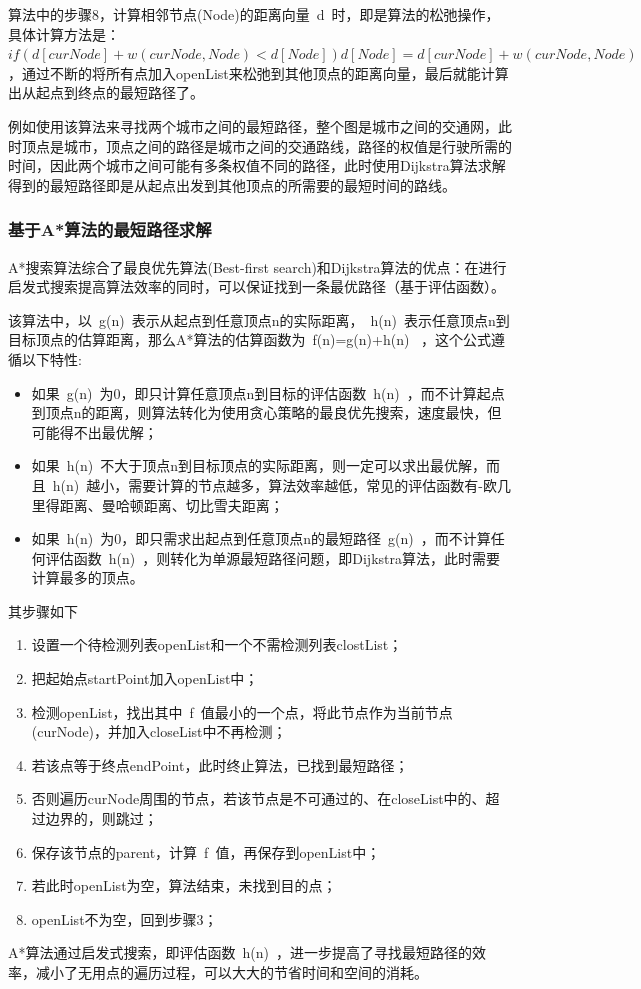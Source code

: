 \par 算法中的步骤8，计算相邻节点(Node)的距离向量~d~时，即是算法的松弛操作，具体计算方法是：$if (d[curNode] + w(curNode, Node) < d[Node]) d[Node] = d[curNode] + w(curNode, Node)$，通过不断的将所有点加入openList来松弛到其他顶点的距离向量，最后就能计算出从起点到终点的最短路径了。
\par 例如使用该算法来寻找两个城市之间的最短路径，整个图是城市之间的交通网，此时顶点是城市，顶点之间的路径是城市之间的交通路线，路径的权值是行驶所需的时间，因此两个城市之间可能有多条权值不同的路径，此时使用Dijkstra算法求解得到的最短路径即是从起点出发到其他顶点的所需要的最短时间的路线。

\FloatBarrier
\subsubsection{基于A*算法的最短路径求解}
\label{section:A*algorithm_exp}
\par A*搜索算法综合了最良优先算法(Best-first search)和Dijkstra算法的优点：在进行启发式搜索提高算法效率的同时，可以保证找到一条最优路径（基于评估函数）。
\par 该算法中，以~g(n)~表示从起点到任意顶点n的实际距离，~h(n)~表示任意顶点n到目标顶点的估算距离，那么A*算法的估算函数为~f(n)=g(n)+h(n)~ ，这个公式遵循以下特性:
\begin{itemize}
    \item 如果~g(n)~为0，即只计算任意顶点n到目标的评估函数~h(n)~，而不计算起点到顶点n的距离，则算法转化为使用贪心策略的最良优先搜索，速度最快，但可能得不出最优解；
    \item 如果~h(n)~不大于顶点n到目标顶点的实际距离，则一定可以求出最优解，而且~h(n)~越小，需要计算的节点越多，算法效率越低，常见的评估函数有-欧几里得距离、曼哈顿距离、切比雪夫距离；
    \item 如果~h(n)~为0，即只需求出起点到任意顶点n的最短路径~g(n)~，而不计算任何评估函数~h(n)~，则转化为单源最短路径问题，即Dijkstra算法，此时需要计算最多的顶点。
\end{itemize}
\par 其步骤如下
\begin{enumerate}
    \item 设置一个待检测列表openList和一个不需检测列表clostList；
    \item 把起始点startPoint加入openList中；
    \item 检测openList，找出其中~f~值最小的一个点，将此节点作为当前节点(curNode)，并加入closeList中不再检测；
    \item 若该点等于终点endPoint，此时终止算法，已找到最短路径；
    \item 否则遍历curNode周围的节点，若该节点是不可通过的、在closeList中的、超过边界的，则跳过；
    \item 保存该节点的parent，计算~f~值，再保存到openList中；
    \item 若此时openList为空，算法结束，未找到目的点；
    \item openList不为空，回到步骤3；
\end{enumerate}
\par A*算法通过启发式搜索，即评估函数~h(n)~，进一步提高了寻找最短路径的效率，减小了无用点的遍历过程，可以大大的节省时间和空间的消耗。

